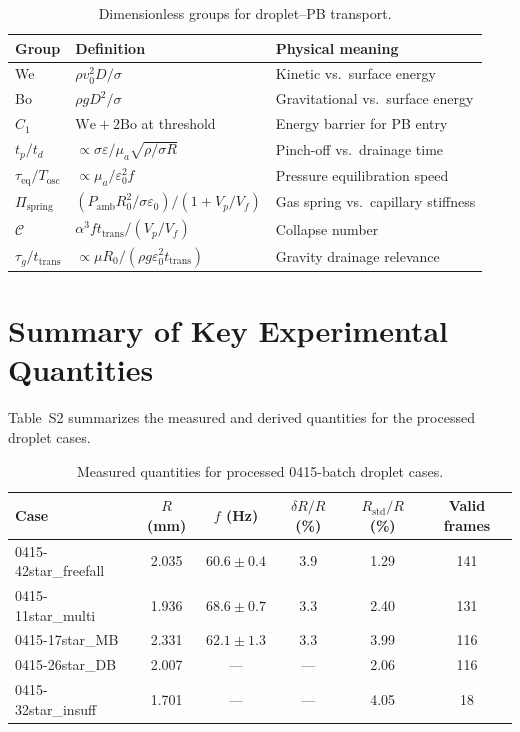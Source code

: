 \documentclass[%
 preprint,
 superscriptaddress,
 amsmath,amssymb,
 aps, prl,
]{revtex4-2}
\begin{document}
\begin{table}[h]
\caption{Dimensionless groups for droplet--PB transport.}
\label{tab:dimensionless}
\begin{ruledtabular}
\begin{tabular}{lll}
\textbf{Group} & \textbf{Definition} & \textbf{Physical meaning} \\
\hline
We  & $\rho v_0^2 D / \sigma$ & Kinetic vs.\ surface energy \\
Bo  & $\rho g D^2 / \sigma$   & Gravitational vs.\ surface energy \\
$C_1$ & $\text{We}+2\text{Bo}$ at threshold & Energy barrier for PB entry \\
$t_p/t_d$ & $\propto \sigma\varepsilon/\mu_a\sqrt{\rho/\sigma R}$ & Pinch-off vs.\ drainage time \\
$\tau_{\text{eq}}/T_{\text{osc}}$ & $\propto \mu_a/\varepsilon_0^2 f$ & Pressure equilibration speed \\
$\Pi_{\text{spring}}$ & $(P_{\text{amb}}R_0^2/\sigma\varepsilon_0)/(1+V_p/V_f)$ & Gas spring vs.\ capillary stiffness \\
$\mathcal{C}$ & $\alpha^3 f t_{\text{trans}}/(V_p/V_f)$ & Collapse number \\
$\tau_g/t_{\text{trans}}$ & $\propto \mu R_0/(\rho g\varepsilon_0^2 t_{\text{trans}})$ & Gravity drainage relevance \\
\hline
\end{tabular}
\end{ruledtabular}
\end{table}

\section{Summary of Key Experimental Quantities}

Table~S2 summarizes the measured and derived quantities for the processed
droplet cases.

\begin{table}[h]
\caption{Measured quantities for processed 0415-batch droplet cases.}
\label{tab:experimental}
\begin{ruledtabular}
\begin{tabular}{lccccc}
\textbf{Case} & $R$ (mm) & $f$ (Hz) & $\delta R/R$ (\%) &
$R_{\text{std}}/R$ (\%) & Valid frames \\
\hline
0415-42star\_freefall & 2.035 & $60.6\pm0.4$ & 3.9 & 1.29 & 141 \\
0415-11star\_multi    & 1.936 & $68.6\pm0.7$ & 3.3 & 2.40 & 131 \\
0415-17star\_MB       & 2.331 & $62.1\pm1.3$ & 3.3 & 3.99 & 116 \\
0415-26star\_DB       & 2.007 & --- & --- & 2.06 & 116 \\
0415-32star\_insuff   & 1.701 & --- & --- & 4.05 & 18 \\
\hline
\end{tabular}
\end{ruledtabular}
\end{table}
\end{document}
